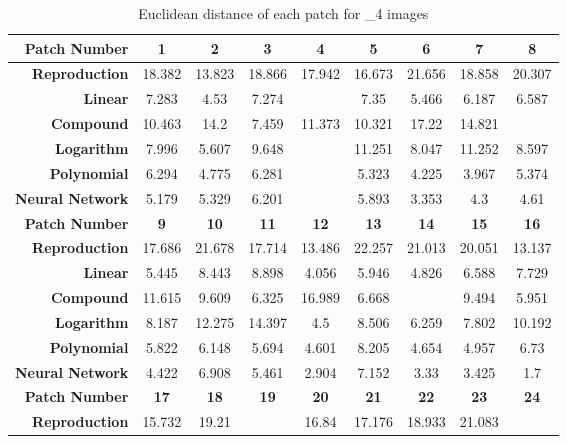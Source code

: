 \begin{table}[H]
  \caption{Euclidean distance of each patch for _4 images }
  \begin{center}
    \begin{tabularx}{\textwidth}{r c c c c c c c c}
    \toprule
        \textbf{Patch Number} & \textbf{1} & \textbf{2} & \textbf{3} & \textbf{4} & \textbf{5} & \textbf{6} & \textbf{7} & \textbf{8}\\ \midrule 
        \textbf{Reproduction} &18.382 &13.823 &18.866 &17.942 &16.673 &21.656 &18.858 &20.307\\ 
        \textbf{Linear} &7.283 &4.53 &7.274 &\cellcolor{colorred}{12.56} &7.35 &5.466 &6.187 &6.587\\ 
        \textbf{Compound} &10.463 &14.2 &7.459 &11.373 &10.321 &17.22 &14.821 &\cellcolor{colorred}{21.988}\\ 
        \textbf{Logarithm} &7.996 &5.607 &9.648 &\cellcolor{colorred}{15.072} &11.251 &8.047 &11.252 &8.597\\ 
        \textbf{Polynomial} &6.294 &4.775 &6.281 &\cellcolor{colorred}{8.522} &5.323 &4.225 &3.967 &5.374\\ 
        \textbf{Neural Network} &5.179 &5.329 &6.201 &\cellcolor{colorred}{7.442} &5.893 &3.353 &4.3 &4.61\\ \midrule 
        \textbf{Patch Number} & \textbf{9} & \textbf{10} & \textbf{11} & \textbf{12} & \textbf{13} & \textbf{14} & \textbf{15} & \textbf{16}\\ \midrule 
        \textbf{Reproduction} &17.686 &21.678 &17.714 &13.486 &22.257 &21.013 &20.051 &13.137\\ 
        \textbf{Linear} &5.445 &8.443 &8.898 &4.056 &5.946 &4.826 &6.588 &7.729\\ 
        \textbf{Compound} &11.615 &9.609 &6.325 &16.989 &6.668 &\cellcolor{colorgreen}{5.001} &9.494 &5.951\\ 
        \textbf{Logarithm} &8.187 &12.275 &14.397 &4.5 &8.506 &6.259 &7.802 &10.192\\ 
        \textbf{Polynomial} &5.822 &6.148 &5.694 &4.601 &8.205 &4.654 &4.957 &6.73\\ 
        \textbf{Neural Network} &4.422 &6.908 &5.461 &2.904 &7.152 &3.33 &3.425 &1.7\\ \midrule 
        \textbf{Patch Number} & \textbf{17} & \textbf{18} & \textbf{19} & \textbf{20} & \textbf{21} & \textbf{22} & \textbf{23} & \textbf{24}\\ \midrule 
        \textbf{Reproduction} &15.732 &19.21 &\cellcolor{colorgreen}{8.956} &16.84 &17.176 &18.933 &21.083 &\cellcolor{colorred}{26.841}\\ 

\end{tabularx}
\end{center}
\end{table}
